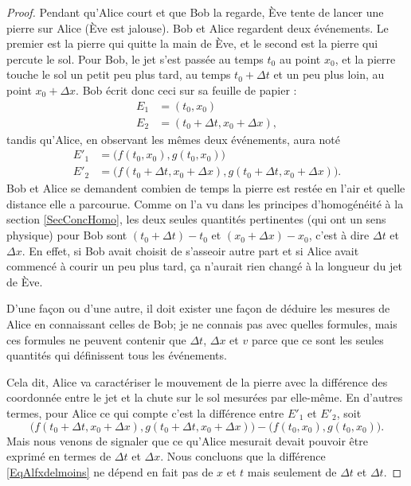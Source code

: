 \documentclass[a4paper,12pt]{book}
\theoremstyle{mes_exemples}	\newtheorem{exemple}[numtho]{Exemple}
\theoremstyle{mes_tho}
\begin{document}
\begin{proof}
Pendant qu'Alice court et que Bob la regarde, Ève tente de lancer une pierre sur Alice (Ève est jalouse). Bob et Alice regardent deux événements. Le premier est la pierre qui quitte la main de Ève, et le second est la pierre qui percute le sol. Pour Bob, le jet s'est passée au temps $t_0$ au point $x_0$, et la pierre touche le sol un petit peu plus tard, au temps $t_0+\Delta t$ et un peu plus loin, au point $x_0+\Delta x$. Bob écrit donc ceci sur sa feuille de papier :
\[ 
\begin{split}
E_1&=(t_0,x_0)\\
E_2&=(t_0+\Delta t,x_0+\Delta x),
\end{split}  
\]
tandis qu'Alice, en observant les mêmes deux événements, aura noté
\[ 
\begin{split}
E'_1&=\big( f(t_0,x_0),g(t_0,x_0) \big) \\
E'_2&=\big( f(t_0+\Delta t,x_0+\Delta x), g(t_0+\Delta t,x_0+\Delta x) \big).
\end{split}  
\]
Bob et Alice se demandent combien de temps la pierre est restée en l'air et quelle distance elle a parcourue. Comme on l'a vu dans les principes d'homogénéité à la section \ref{SecConcHomo}, les deux seules quantités pertinentes (qui ont un sens physique) pour Bob sont $(t_0+\Delta t)-t_0$ et $(x_0+\Delta x)-x_0$, c'est à dire $\Delta t$ et $\Delta x$. En effet, si Bob avait choisit de s'asseoir autre part et si Alice avait commencé à courir un peu plus tard, ça n'aurait rien changé à la longueur du jet de Ève.

D'une façon ou d'une autre, il doit exister une façon de déduire les mesures de Alice en connaissant celles de Bob; je ne connais pas avec quelles formules, mais ces formules ne peuvent contenir que $\Delta t$, $\Delta x$ et $v$ parce que ce sont les seules quantités qui définissent tous les événements.

Cela dit, Alice va caractériser le mouvement de la pierre avec la différence des coordonnée entre le jet et la chute sur le sol mesurées par elle-même. En d'autres termes, pour Alice ce qui compte c'est la différence entre $E'_1$ et $E'_2$, soit
\begin{equation}	\label{EqAlfxdelmoins}
   \big( f(t_0+\Delta t,x_0+\Delta x), g(t_0+\Delta t,x_0+\Delta x) \big)-\big( f(t_0,x_0),g(t_0,x_0) \big).
\end{equation} 
Mais nous venons de signaler que ce qu'Alice mesurait devait pouvoir être exprimé en termes de $\Delta t$ et $\Delta x$. Nous concluons que la différence \eqref{EqAlfxdelmoins} ne dépend en fait pas de $x$ et $t$ mais seulement de $\Delta t$ et $\Delta t$.


\end{proof}
\end{document}
